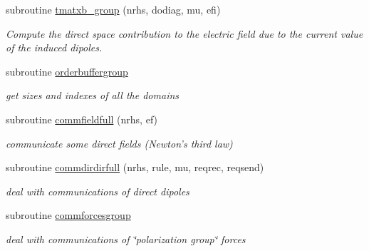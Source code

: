 \begin{DoxyCompactItemize}
subroutine \hyperlink{newinduce__group_8f90_a5f31a75136645906af5ee55bff7ee718}{tmatxb\-\_\-group} (nrhs, dodiag, mu, efi)
\begin{DoxyCompactList}\small\item\em Compute the direct space contribution to the electric field due to the current value of the induced dipoles. \end{DoxyCompactList}\item 
subroutine \hyperlink{newinduce__group_8f90_a62705acb7eab61eccbeabc5fca41029a}{orderbuffergroup}
\begin{DoxyCompactList}\small\item\em get sizes and indexes of all the domains \end{DoxyCompactList}\item 
subroutine \hyperlink{newinduce__group_8f90_a91fdbc155425a64682eff199c78a47e2}{commfieldfull} (nrhs, ef)
\begin{DoxyCompactList}\small\item\em communicate some direct fields (Newton's third law) \end{DoxyCompactList}\item 
subroutine \hyperlink{newinduce__group_8f90_af48dcedaa60632c69eda5116bcf33d70}{commdirdirfull} (nrhs, rule, mu, reqrec, reqsend)
\begin{DoxyCompactList}\small\item\em deal with communications of direct dipoles \end{DoxyCompactList}\item 
subroutine \hyperlink{newinduce__group_8f90_a58d711757eaf29d93f59834af906379f}{commforcesgroup}
\begin{DoxyCompactList}\small\item\em deal with communications of \char`\"{}polarization group\char`\"{} forces \end{DoxyCompactList}\end{DoxyCompactItemize}


